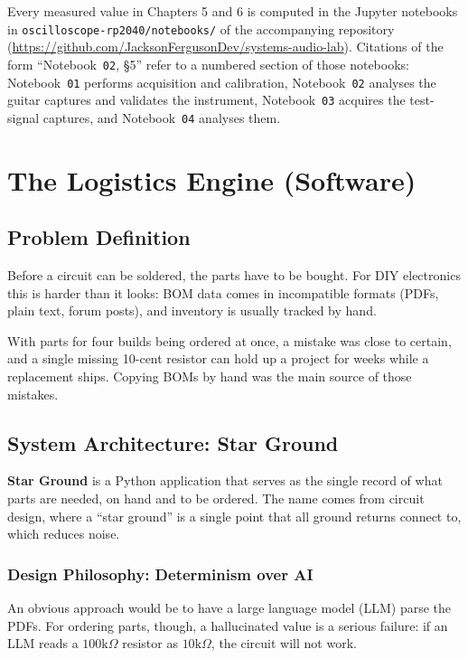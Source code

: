 \documentclass[11pt, a4paper]{report}
\begin{document}
Every measured value in Chapters 5 and 6 is computed in the Jupyter notebooks in \texttt{oscilloscope-rp2040/notebooks/} of the accompanying repository (\url{https://github.com/JacksonFergusonDev/systems-audio-lab}). Citations of the form ``Notebook~\texttt{02}, \S5'' refer to a numbered section of those notebooks: Notebook~\texttt{01} performs acquisition and calibration, Notebook~\texttt{02} analyses the guitar captures and validates the instrument, Notebook~\texttt{03} acquires the test-signal captures, and Notebook~\texttt{04} analyses them.

\chapter{The Logistics Engine (Software)}

\section{Problem Definition}
Before a circuit can be soldered, the parts have to be bought. For DIY electronics this is harder than it looks: BOM data comes in incompatible formats (PDFs, plain text, forum posts), and inventory is usually tracked by hand.

With parts for four builds being ordered at once, a mistake was close to certain, and a single missing 10-cent resistor can hold up a project for weeks while a replacement ships. Copying BOMs by hand was the main source of those mistakes.\cite{openbom_bom_pitfalls}

\section{System Architecture: Star Ground}
\textbf{Star Ground} is a Python application that serves as the single record of what parts are needed, on hand and to be ordered. The name comes from circuit design, where a ``star ground'' is a single point that all ground returns connect to, which reduces noise.\cite{nw_star_point_grounding}

\subsection{Design Philosophy: Determinism over AI}
An obvious approach would be to have a large language model (LLM) parse the PDFs. For ordering parts, though, a hallucinated value is a serious failure:\cite{llm_hallucination_survey} if an LLM reads a $100\text{k}\Omega$ resistor as $10\text{k}\Omega$, the circuit will not work.
\end{document}
